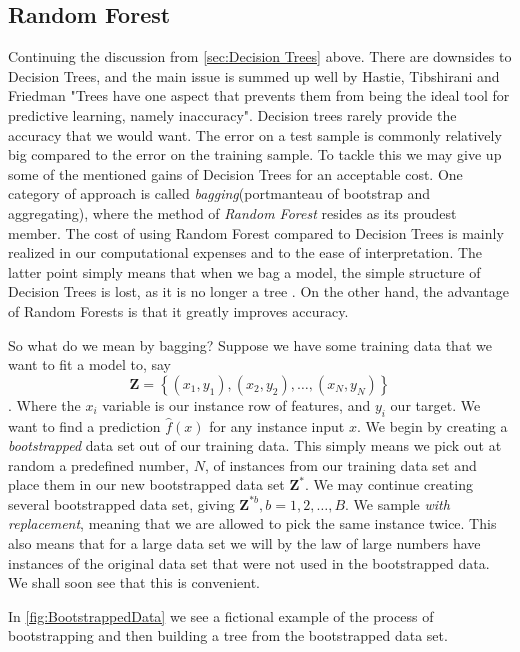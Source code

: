 \subsection{Random Forest}
Continuing the discussion from \cref{sec:Decision Trees} above. There are downsides to Decision Trees, and the main issue is summed up well by Hastie, Tibshirani and Friedman "Trees have one aspect that prevents them from being the ideal tool for predictive learning, namely inaccuracy"\cite[p.~352]{statelem}.
Decision trees rarely provide the accuracy that we would want. The error on a test sample is commonly relatively big compared to the error on the training sample. To tackle this we may give up some of the mentioned gains of Decision Trees for an acceptable cost. One category of approach is called \textit{bagging}(portmanteau of bootstrap and aggregating), where the method of \textit{Random Forest} resides as its proudest member. The cost of using Random Forest compared to Decision Trees is mainly realized in our computational expenses and to the ease of interpretation. The latter point simply means that when we bag a model, the simple structure of Decision Trees is lost, as it is no longer a tree \cite[p.~352]{statelem}. On the other hand, the advantage of Random Forests is that it greatly improves accuracy.

So what do we mean by bagging? Suppose we have some training data that we want to fit a model to, say
\begin{equation}
\mathbf{Z}=\left\{\left(x_{1}, y_{1}\right),\left(x_{2}, y_{2}\right), \dots,\left(x_{N}, y_{N}\right)\right\}
\end{equation}.
Where the $x_i$ variable is our instance row of features, and $y_i$ our target.
We want to find a prediction $\hat{f}(x)$ for any instance input $x$.
We begin by creating a \textit{bootstrapped} data set out of our training data.
This simply means we pick out at random a predefined number, $N$, of instances from our training data set and place them in our new bootstrapped data set $\mathbf{Z}^{*}$. We may continue creating several bootstrapped data set, giving $\mathbf{Z}^{* b}, b=1,2, \ldots, B$.
We sample \textit{with replacement}, meaning that we are allowed to pick the same instance twice. This also means that for a large data set we will by the law of large numbers have instances of the original data set that were not used in the bootstrapped data. We shall soon see that this is convenient. 

In \cref{fig:BootstrappedData} we see a fictional example of the process of bootstrapping and then building a tree from the bootstrapped data set.

